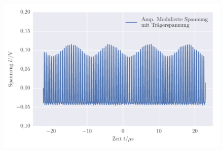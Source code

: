 
\FloatBarrier\begin{figure}[!h]
\centering
\includegraphics[scale=1]{../Grafiken/Amplituden_Modulierte_Spannung_mit_Traeger.pdf}
\caption{\label{fig:amplituden_modulierte_spannung_mit_traeger}}
\end{figure}
\FloatBarrier